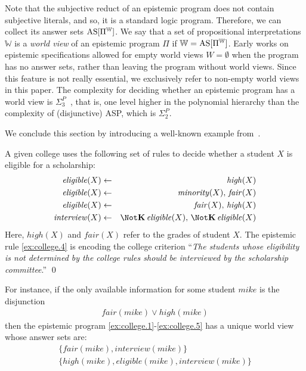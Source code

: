 \documentclass{new_tlp}
\def\K{\mathbf{K}\, }
\let\sneg\relax
\newcommand{\sneg}{\ensuremath{\text{-}}}
\def\AS{\text{\rm AS}}
\newcommand\wv{\mathbb{W}}
\def\eligible{\mathit{eligible}}
\def\minority{\mathit{minority}}
\def\high{\mathit{high}}
\def\fair{\mathit{fair}}
\def\interview{\mathit{interview}}
\begin{document}
Note that the subjective reduct of an epistemic program does not contain subjective literals, and so, it is a standard logic program.
%
Therefore, we can collect its answer sets $\AS[\Pi^\wv]$.
%
We say that a set of propositional interpretations $\wv$ is a \emph{world view} of an epistemic program $\Pi$ if $\wv=\AS[\Pi^\wv]$.
%
Early works on epistemic specifications allowed for empty world views $W=\emptyset$ when the program has no answer sets, rather than leaving the program without world views.
%
Since this feature is not really essential, we exclusively refer to non-empty world views in this paper.
%
The complexity for deciding whether an epistemic program has a world view is $\Sigma^{P}_{3}$~\cite{truszczynski11b}, that is,
one level higher in the polynomial hierarchy than the complexity of (disjunctive) ASP, which is $\Sigma^{P}_{2}$.

We conclude this section by introducing a well-known example from~\cite{gelfond91a}.

\begin{example}\label{ex:college}
A given college uses the following set of rules to decide whether a student $X$ is eligible for a scholarship:
\begin{eqnarray}
\eligible(X) & \leftarrow & \high(X)   \label{ex:college.1} \\
\eligible(X) & \leftarrow & \minority(X),\, \fair(X) \label{ex:college.2}\\
\sneg\eligible(X) & \leftarrow & \sneg\fair(X),\, \sneg\high(X) \label{ex:college.3}\\
\interview(X) &\leftarrow  &\Not \K \eligible(X),\,
\Not \K \sneg \eligible(X) \label{ex:college.4}
\end{eqnarray}
Here, $\high(X)$ and $\fair(X)$ refer to the grades of student $X$.
The epistemic rule \eqref{ex:college.4} is encoding the college criterion
``\emph{The students whose eligibility is not determined by the college rules should be interviewed by the scholarship committee}.''
\qed
\end{example}
For instance, if the only available information for some student $mike$ is the disjunction
\begin{gather}
\fair(mike) \vee \high(mike) \label{ex:college.5}
\end{gather}
then the epistemic program \eqref{ex:college.1}-\eqref{ex:college.5} has a unique world view whose answer sets are:
\begin{eqnarray}
&\{\fair(mike),\interview(mike)\}& \label{f:sm1}\\
&\{\high(mike), \eligible(mike),\interview(mike)\} &\label{f:sm2}
\end{eqnarray}
\end{document}
